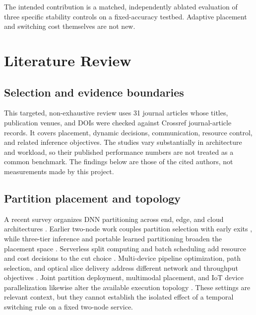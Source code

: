 \documentclass[10pt,a4paper,twocolumn]{article}
\begin{document}
The intended contribution is a matched, independently ablated evaluation of three specific stability controls on a fixed-accuracy testbed. Adaptive placement and switching cost themselves are not new.

\section{Literature Review}
\subsection{Selection and evidence boundaries}
This targeted, non-exhaustive review uses 31 journal articles whose titles, publication venues, and DOIs were checked against Crossref journal-article records. It covers placement, dynamic decisions, communication, resource control, and related inference objectives. The studies vary substantially in architecture and workload, so their published performance numbers are not treated as a common benchmark. The findings below are those of the cited authors, not measurements made by this project.

\subsection{Partition placement and topology}
A recent survey organizes DNN partitioning across end, edge, and cloud architectures \cite{survey}. Earlier two-node work couples partition selection with early exits \cite{edgent}, while three-tier inference and portable learned partitioning broaden the placement space \cite{liu2023,partner}. Serverless split computing and batch scheduling add resource and cost decisions to the cut choice \cite{serverless,batch}. Multi-device pipeline optimization, path selection, and optical slice delivery address different network and throughput objectives \cite{dnnpipe,huang,optical}. Joint partition deployment, multimodal placement, and IoT device parallelization likewise alter the available execution topology \cite{jointdeploy,hga,eddnn}. These settings are relevant context, but they cannot establish the isolated effect of a temporal switching rule on a fixed two-node service.
\end{document}
